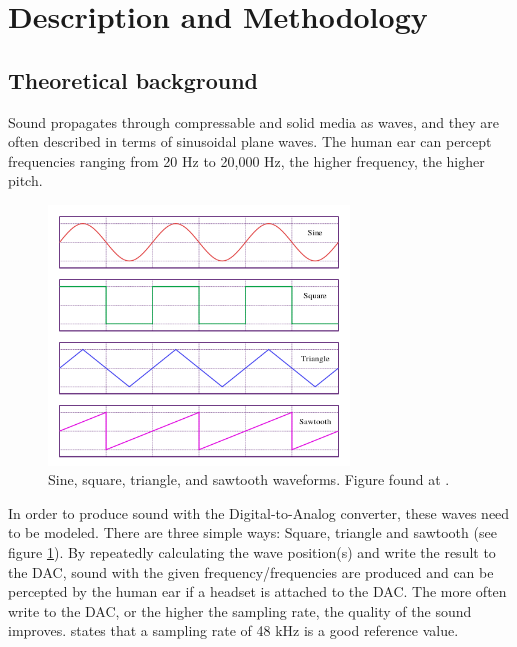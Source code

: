 \section{Description and Methodology}

\subsection{Theoretical background}
Sound propagates through compressable and solid media as waves, and they are often described in terms of sinusoidal plane waves. The human ear can percept frequencies ranging from 20 Hz to 20,000 Hz, the higher frequency, the higher pitch.
\begin{figure}[h]
	\centering
	\includegraphics[width=8cm]{img/waveforms.png}
	\caption{Sine, square, triangle, and sawtooth waveforms. Figure found at \cite{wikipedia_sawtooth}.}
	\label{fig:sawtooth}
\end{figure}

In order to produce sound with the Digital-to-Analog converter, these waves need to be modeled. There are three simple ways: Square, triangle and sawtooth (see figure \ref{fig:sawtooth}). By repeatedly calculating the wave position(s) and write the result to the DAC, sound with the given frequency/frequencies are produced and can be percepted by the human ear if a headset is attached to the DAC. The more often write to the DAC, or the higher the sampling rate, the quality of the sound improves. \cite{compendium} states that a sampling rate of 48 kHz is a good reference value. 

